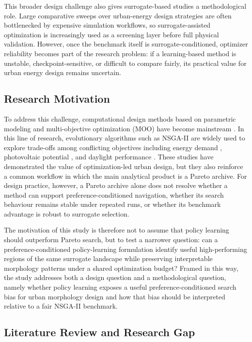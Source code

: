 \documentclass[final,3p,times]{elsarticle}
\begin{document}
This broader design challenge also gives surrogate-based studies a methodological role. Large comparative sweeps over urban-energy design strategies are often bottlenecked by expensive simulation workflows, so surrogate-assisted optimization is increasingly used as a screening layer before full physical validation. However, once the benchmark itself is surrogate-conditioned, optimizer reliability becomes part of the research problem: if a learning-based method is unstable, checkpoint-sensitive, or difficult to compare fairly, its practical value for urban energy design remains uncertain.

\subsection{Research Motivation}

To address this challenge, computational design methods based on parametric modeling and multi-objective optimization (MOO) have become mainstream \cite{ref9,ref10}. In this line of research, evolutionary algorithms such as NSGA-II are widely used to explore trade-offs among conflicting objectives including energy demand \cite{ref11}, photovoltaic potential \cite{ref12}, and daylight performance \cite{ref13}. These studies have demonstrated the value of optimization-led urban design, but they also reinforce a common workflow in which the main analytical product is a Pareto archive. For design practice, however, a Pareto archive alone does not resolve whether a method can support preference-conditioned navigation, whether its search behaviour remains stable under repeated runs, or whether its benchmark advantage is robust to surrogate selection.

The motivation of this study is therefore not to assume that policy learning should outperform Pareto search, but to test a narrower question: can a preference-conditioned policy-learning formulation identify useful high-performing regions of the same surrogate landscape while preserving interpretable morphology patterns under a shared optimization budget? Framed in this way, the study addresses both a design question and a methodological question, namely whether policy learning exposes a useful preference-conditioned search bias for urban morphology design and how that bias should be interpreted relative to a fair NSGA-II benchmark.

\subsection{Literature Review and Research Gap}
\end{document}
